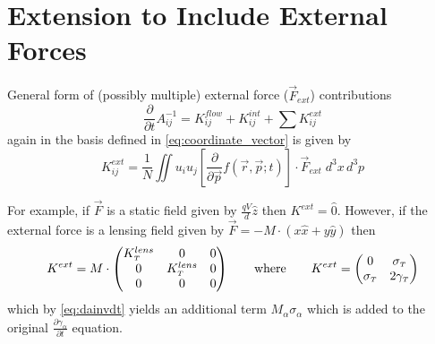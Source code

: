 
\section{Extension to Include External Forces} \label{sec:external_forces}

General form of (possibly multiple) external force ($\vec{F}_{ext}$) contributions
\begin{equation}
  \frac{\partial}{\partial t} A^{-1}_{ij} = K^{flow}_{ij} + K^{int}_{ij} + \sum K^{ext}_{ij}
\end{equation}
again in the basis defined in \ref{eq:coordinate_vector} is given by
\begin{equation}
  K^{ext}_{ij} = \frac{1}{N} \iint u_i u_j \left [ \frac{\partial}{\partial \vec{p}} f(\vec{r}, \vec{p}; t) \right ] \cdot \vec{F}_{ext}\;d^{3}x\,d^{3}p
\end{equation}

For example, if $\vec{F}$ is a static field given by $\frac{qV}{d}\hat{z}$ then $K^{ext} = \hat{0}$. However, if the external force is a lensing field given by $\vec{F} = -M\cdot(x\hat{x}+y\hat{y})$ then 
\begin{equation}
  K^{ext} = M \cdot 
  \begin{pmatrix}
    K^{lens}_{{\scriptscriptstyle T}} & 0 & 0 \\
    0 & K^{lens}_{{\scriptscriptstyle T}} & 0 \\
    0 & 0 & 0
  \end{pmatrix}
  \qquad \text{where} \qquad
  K^{ext} = 
  \begin{pmatrix}
    0 & \sigma_{{\scriptscriptstyle T}} \\
    \sigma_{{\scriptscriptstyle T}} & 2 \gamma_{{\scriptscriptstyle T}}
  \end{pmatrix}
\end{equation}
which by \ref{eq:dainvdt} yields an additional term $M_{\alpha} \sigma_{\alpha}$ which is added to the original $\frac{\partial \gamma_{\alpha}}{\partial t}$ equation.
